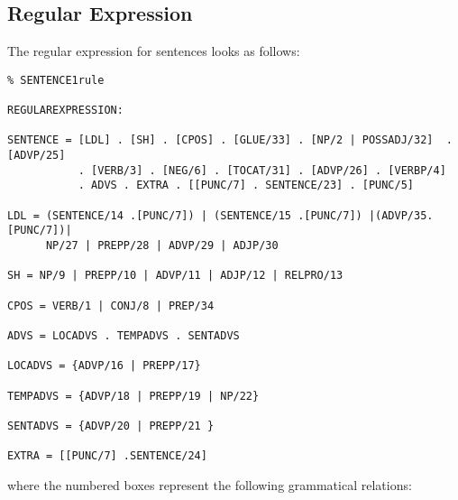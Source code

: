 \subsection{Regular Expression}
The regular expression for sentences looks as follows:
\begin{verbatim}
% SENTENCE1rule

REGULAREXPRESSION:
 
SENTENCE = [LDL] . [SH] . [CPOS] . [GLUE/33] . [NP/2 | POSSADJ/32]  . [ADVP/25] 
           . [VERB/3] . [NEG/6] . [TOCAT/31] . [ADVP/26] . [VERBP/4]
           . ADVS . EXTRA . [[PUNC/7] . SENTENCE/23] . [PUNC/5]

LDL = (SENTENCE/14 .[PUNC/7]) | (SENTENCE/15 .[PUNC/7]) |(ADVP/35.[PUNC/7])|
      NP/27 | PREPP/28 | ADVP/29 | ADJP/30

SH = NP/9 | PREPP/10 | ADVP/11 | ADJP/12 | RELPRO/13

CPOS = VERB/1 | CONJ/8 | PREP/34

ADVS = LOCADVS . TEMPADVS . SENTADVS

LOCADVS = {ADVP/16 | PREPP/17}

TEMPADVS = {ADVP/18 | PREPP/19 | NP/22}

SENTADVS = {ADVP/20 | PREPP/21 }

EXTRA = [[PUNC/7] .SENTENCE/24]
\end{verbatim}
where the numbered boxes represent the following grammatical relations:\\
